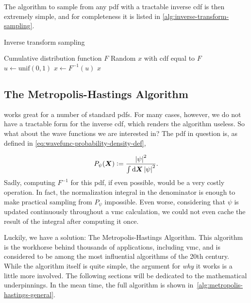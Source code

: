 \documentclass[Thesis.tex]{subfiles}
\begin{document}
The algorithm to sample from any \gls{pdf} with a tractable inverse \gls{cdf} is
then extremely simple, and for completeness it is listed in
\cref{alg:inverse-transform-sampling}.

\begin{algorithm}[h]
    \caption{Inverse transform sampling}
    \label{alg:inverse-transform-sampling}
    \begin{algorithmic}[1]
        \Require Cumulative distribution function $F$
        \Ensure Random $x$ with \gls{cdf} equal to $F$
        \Repeat
          \State $u\gets\text{unif}(0,1)$
          \State $x\gets F^{-1}(u)$
          \State \Yield $x$
    \end{algorithmic}
\end{algorithm}

\subsection{The Metropolis-Hastings Algorithm}
\label{sec:metro-hastings-alg}

 works great for a number of standard
\glspl{pdf}. For many cases, however, we do not have a tractable form for the inverse
\gls{cdf}, which renders the algorithm useless. So what about the wave functions we
are interested in? The \gls{pdf} in question is, as defined in \cref{eq:wavefunc-probability-density-def},

\begin{align}
    P_{\psi}(\bm{X}) \vcentcolon= \frac{\abs{\psi}^2}{\int\dd{\bm{X}}\abs{\psi}^2}.
\end{align}
Sadly, computing $F^{-1}$ for this \gls{pdf}, if even possible, would be a very costly
operation. In fact, the normalization integral in the denominator is enough to
make practical sampling from $P_\psi$ impossible. Even worse, considering that
$\psi$ is updated continuously throughout a \gls{vmc} calculation, we could not even
cache the result of the integral after computing it once.

Luckily, we have a solution: The Metropolis-Hastings Algorithm. This algorithm
is the workhorse behind thousands of applications, including \gls{vmc}, and is
considered to be among the most influential algorithms of the 20th century.
While the algorithm itself is quite simple, the argument for \emph{why} it
works is a little more involved. The following sections will be dedicated to the
mathematical underpinnings. In the mean time, the full algorithm is shown
in~\cref{alg:metropolis-hastings-general}.
\end{document}
